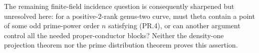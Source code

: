 The remaining finite-field incidence question is consequently
sharpened but unresolved here: for a positive-$2$-rank genus-two
curve, must theta contain a point of some odd prime-power order
$n$ satisfying (PR.4), or can another argument control all the
needed proper-conductor blocks? Neither the density-one projection
theorem nor the prime distribution theorem proves this assertion.
